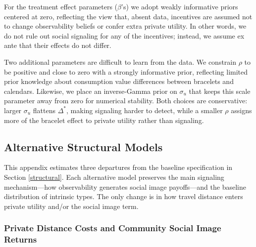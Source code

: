 \documentclass[12pt,a4paper]{article}
\begin{document}
For the treatment effect parameters (\(\beta\)’s) we adopt weakly informative priors centered at zero, reflecting the view that, absent data, incentives are assumed not to change observability beliefs or confer extra private utility. In other words, we do not rule out social signaling for any of the incentives; instead, we assume ex ante that their effects do not differ.

Two additional parameters are difficult to learn from the data.  We constrain \(\rho\) to be positive and close to zero with a strongly informative prior, reflecting limited prior knowledge about consumption value differences between bracelets and calendars.  Likewise, we place an inverse‑Gamma prior on \(\sigma_{u}\) that keeps this scale parameter away from zero for numerical stability.  Both choices are conservative: larger \(\sigma_{u}\) flattens \(\Delta^{\ast}\), making signaling harder to detect, while a smaller \(\rho\) assigns more of the bracelet effect to private utility rather than signaling.

\newpage



\setcounter{table}{0}
\renewcommand{\thetable}{I\arabic{table}}

\setcounter{figure}{0}
\renewcommand{\thefigure}{I\arabic{figure}}


\renewcommand{\thesubsection}{\Alph{subsection}}

\subsection{Alternative Structural Models}\label{sec:altmodels}

This appendix estimates three departures from the baseline specification in Section \ref{structural}. Each alternative model preserves the main signaling mechanism—how observability generates social image payoffs—and the baseline distribution of intrinsic types. The only change is in how travel distance enters private utility and/or the social image term.

\subsubsection{Private Distance Costs and Community Social Image Returns}\label{sec:private-cost-community-rep}
\end{document}
